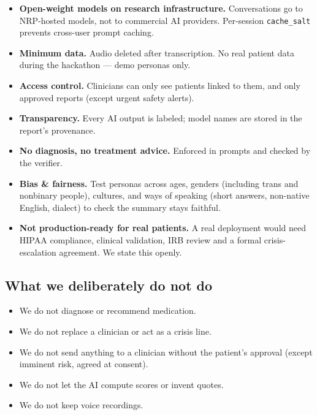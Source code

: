 \documentclass[11pt]{article}
\begin{document}
\begin{itemize}
  \item \textbf{Open-weight models on research infrastructure.} Conversations go to NRP-hosted models, not to commercial AI providers.
        Per-session \texttt{cache\_salt} prevents cross-user prompt caching.
  \item \textbf{Minimum data.} Audio deleted after transcription. No real patient data during the hackathon --- demo personas only.
  \item \textbf{Access control.} Clinicians can only see patients linked to them, and only approved reports (except urgent safety alerts).
  \item \textbf{Transparency.} Every AI output is labeled; model names are stored in the report's provenance.
  \item \textbf{No diagnosis, no treatment advice.} Enforced in prompts and checked by the verifier.
  \item \textbf{Bias \& fairness.} Test personas across ages, genders (including trans and nonbinary people), cultures, and ways of speaking
        (short answers, non-native English, dialect) to check the summary stays faithful.
  \item \textbf{Not production-ready for real patients.} A real deployment would need HIPAA compliance, clinical validation, IRB review
        and a formal crisis-escalation agreement. We state this openly.
\end{itemize}

\subsection{What we deliberately do not do}
\begin{tcolorbox}[colback=backendbg,colframe=backend,boxrule=0.5pt,arc=2pt]
\begin{itemize}[leftmargin=*]
  \item We do not diagnose or recommend medication.
  \item We do not replace a clinician or act as a crisis line.
  \item We do not send anything to a clinician without the patient's approval (except imminent risk, agreed at consent).
  \item We do not let the AI compute scores or invent quotes.
  \item We do not keep voice recordings.
\end{itemize}
\end{tcolorbox}
\end{document}
